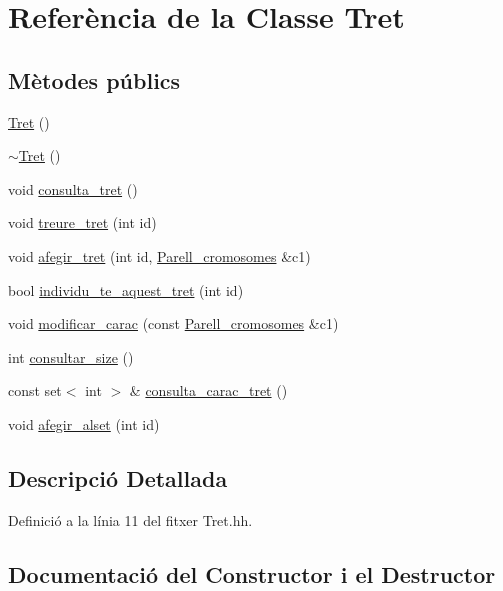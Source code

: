 \hypertarget{class_tret}{}\section{Referència de la Classe Tret}
\label{class_tret}
\subsection*{Mètodes públics}
\begin{DoxyCompactItemize}
\item 
\hyperlink{class_tret_a3c892a10a6d209029a303b46b1deff17}{Tret} ()
\item 
\hyperlink{class_tret_a858f0ea240f57704eb4cb3bce12ebc58}{$\sim$\+Tret} ()
\item 
void \hyperlink{class_tret_ad87c03ee8fb5ec730ca304e29aeb4028}{consulta\+\_\+tret} ()
\item 
void \hyperlink{class_tret_aa1d38521e76438e0f6daf705534052a1}{treure\+\_\+tret} (int id)
\item 
void \hyperlink{class_tret_a7ae85d74f02887b004fd2fd96a148db7}{afegir\+\_\+tret} (int id, \hyperlink{class_parell__cromosomes}{Parell\+\_\+cromosomes} \&c1)
\item 
bool \hyperlink{class_tret_ac05402e277deb769649b9cc9a3c50962}{individu\+\_\+te\+\_\+aquest\+\_\+tret} (int id)
\item 
void \hyperlink{class_tret_a0e35984d0b3ac5fb80af88bbbdaa97a7}{modificar\+\_\+carac} (const \hyperlink{class_parell__cromosomes}{Parell\+\_\+cromosomes} \&c1)
\item 
int \hyperlink{class_tret_ad5a8e88248b75c502b87a87435facb44}{consultar\+\_\+size} ()
\item 
const set$<$ int $>$ \& \hyperlink{class_tret_aea1fbc245127fec4a9fdf5288adc5fc6}{consulta\+\_\+carac\+\_\+tret} ()
\item 
void \hyperlink{class_tret_ad2e436baa72978926fd684531396e458}{afegir\+\_\+alset} (int id)
\end{DoxyCompactItemize}


\subsection{Descripció Detallada}


Definició a la línia 11 del fitxer Tret.\+hh.



\subsection{Documentació del Constructor i el Destructor}
